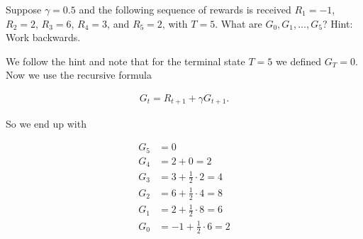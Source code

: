\begin{exercise}
Suppose $\gamma = 0.5$ and the following sequence of rewards is received $R_1 = -1$, $R_2 = 2$, $R_3 = 6$, $R_4 = 3$, and $R_5 = 2$, with $T = 5$.
What are $G_0, G_1 , \dots, G_5$?
Hint:
Work backwards.
\end{exercise}

\begin{solution}
We follow the hint and note that for the terminal state $T = 5$ we defined $G_T = 0$. Now we use the recursive formula

\begin{align*}
  G_t
  =
  R_{t+1} +\gamma G_{t+1}.
\end{align*}

So we end up with

\begin{align*}
  G_5 &= 0 \\
  G_4 &= 2 + 0 = 2 \\
  G_3 &= 3 + \frac{1}{2}\cdot 2 = 4 \\
  G_2 &= 6 + \frac{1}{2}\cdot 4 =  8 \\
  G_1 &= 2 + \frac{1}{2}\cdot 8 = 6 \\
  G_0 &= -1 + \frac{1}{2}\cdot 6 = 2
\end{align*}

\end{solution}

